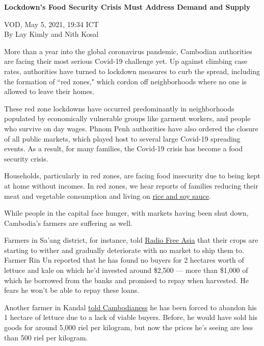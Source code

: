 \documentclass[10pt,a4paper]{letter}
\begin{document}
	
{\Large 
	\textbf{Lockdown's Food Security Crisis Must Address Demand and Supply}
} 

VOD, May 5, 2021, 19:34 ICT \\
By Lay Kimly and Nith Kosal

More than a year into the global coronavirus pandemic, Cambodian authorities are facing their most serious Covid-19 challenge yet. Up against climbing case rates, authorities have turned to lockdown measures to curb the spread, including the formation of ``red zones," which cordon off neighborhoods where no one is allowed to leave their homes.

These red zone lockdowns have occurred predominantly in neighborhoods populated by economically vulnerable groups like garment workers, and people who survive on day wages. Phnom Penh authorities have also ordered the closure of all public markets, which played host to several large Covid-19 spreading events.
As a result, for many families, the Covid-19 crisis has become a food security crisis.

Households, particularly in red zones, are facing food insecurity due to being kept at home without incomes. In red zones, we hear reports of families reducing their meat and vegetable consumption and living on \href{https://www.scmp.com/week-asia/economics/article/3131048/cambodia-extended-phnom-penh-coronavirus-lockdown-leaves}{rice and soy sauce}.

While people in the capital face hunger, with markets having been shut down, Cambodia's farmers are suffering as well.

Farmers in Sa'ang district, for instance, told \href{https://www.rfa.org/khmer/news/economy/farmers-leave-their-vegetables-at-fields-due-to-lack-of-market-while-capital-residents-lack-of-vegetables-04222021075303.html}{Radio Free Asia} that their crops are starting to wither and gradually deteriorate with no market to ship them to. Farmer Rin Un reported that he has found no buyers for 2 hectares worth of lettuce and kale on which he'd invested around \$2,500 --- more than \$1,000 of which he borrowed from the banks and promised to repay when harvested. He fears he won't be able to repay these loans.

Another farmer in Kandal \href{https://cambodianess.com/article/farmer-unable-to-donate-produce-to-locked-down-families}{told Cambodianess} he has been forced to abandon his 1 hectare of lettuce due to a lack of viable buyers. Before, he would have sold his goods for around 5,000 riel per kilogram, but now the prices he's seeing are less than 500 riel per kilogram.
\end{document}
